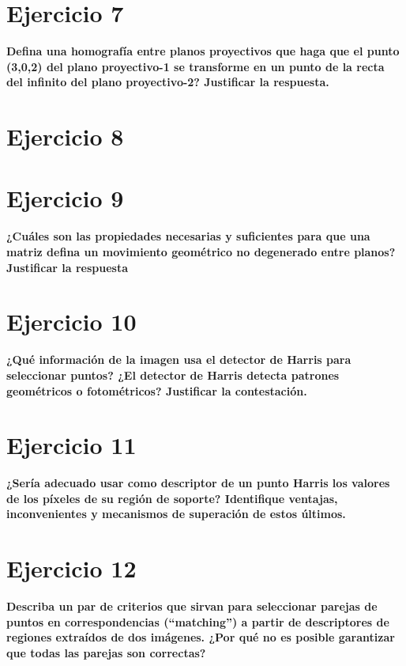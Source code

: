 \documentclass[11pt,a4paper]{article}
\begin{document}
\section*{Ejercicio 7}
\textbf{Defina una homografía entre planos proyectivos que haga que el punto (3,0,2) del plano proyectivo-1 se transforme en un punto de la recta del
infinito del plano proyectivo-2? Justificar la respuesta.}


\section*{Ejercicio 8}
\textbf{}

\section*{Ejercicio 9}
\textbf{¿Cuáles son las propiedades necesarias y suficientes para que una matriz defina un movimiento geométrico no degenerado entre planos? Justificar
la respuesta}


\section*{Ejercicio 10}
\textbf{¿Qué información de la imagen usa el detector de Harris para seleccionar puntos? ¿El detector de Harris detecta patrones geométricos o fotométricos?
Justificar la contestación.}


\section*{Ejercicio 11}
\textbf{¿Sería adecuado usar como descriptor de un punto Harris los valores de los píxeles de su región de soporte? Identifique ventajas, inconvenientes y
mecanismos de superación de estos últimos.}


\section*{Ejercicio 12}
\textbf{Describa un par de criterios que sirvan para seleccionar parejas de puntos en correspondencias (“matching”) a partir de descriptores de regiones
extraídos de dos imágenes. ¿Por qué no es posible garantizar que todas las parejas son correctas?}
\end{document}
